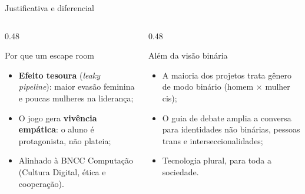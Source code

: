 \documentclass[aspectratio=169, 10pt, t]{beamer}
\begin{document}
\begin{frame}{Justificativa e diferencial}
  \begin{columns}[T]
    \begin{column}{0.48\textwidth}
      \begin{card}{Por que um escape room}
        \begin{itemize}
          \item \textbf{Efeito tesoura} (\textit{leaky pipeline}): maior evasão feminina e poucas mulheres na liderança;
          \item O jogo gera \textbf{vivência empática}: o aluno é protagonista, não plateia;
          \item Alinhado à BNCC Computação (Cultura Digital, ética e cooperação).
        \end{itemize}
      \end{card}
    \end{column}
    \begin{column}{0.48\textwidth}
      \begin{card}{Além da visão binária}
        \begin{itemize}
          \item A maioria dos projetos trata gênero de modo binário (homem × mulher cis);
          \item O guia de debate amplia a conversa para identidades não binárias, pessoas trans e interseccionalidades;
          \item Tecnologia plural, para toda a sociedade.
        \end{itemize}
      \end{card}
    \end{column}
  \end{columns}
\end{frame}
\end{document}
